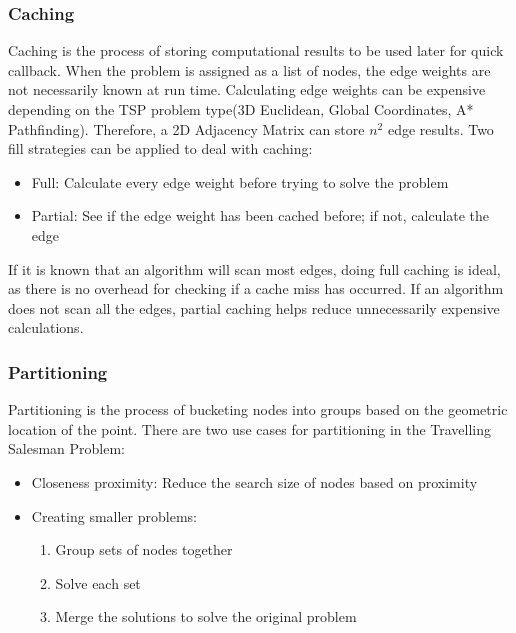 \subsubsection{Caching}
\label{lit:Caching}
Caching is the process of storing computational results to be used later for quick callback. When the problem is assigned as a list of nodes, the edge weights are not necessarily known at run time\cite{applegate2006traveling}. Calculating edge weights can be expensive depending on the TSP problem type(3D Euclidean, Global Coordinates, A* Pathfinding)\cite{Caching-performance}. Therefore, a 2D Adjacency Matrix can store $n^2$ edge results. Two fill strategies can be applied to deal with caching:

\begin{itemize}
    \item Full: Calculate every edge weight before trying to solve the problem
    \item Partial: See if the edge weight has been cached before; if not, calculate the edge
\end{itemize}

If it is known that an algorithm will scan most edges, doing full caching is ideal, as there is no overhead for checking if a cache miss has occurred. If an algorithm does not scan all the edges, partial caching helps reduce unnecessarily expensive calculations.

\subsubsection{Partitioning}
\label{partitioning}
Partitioning is the process of bucketing nodes into groups based on the geometric location of the point\cite{applegate2006traveling}. There are two use cases for partitioning in the Travelling Salesman Problem\cite{karp1977probabilistic}\cite{Clustering-Tsp}\cite{Partioning-tsp}\cite{lin2022grid}:

\begin{itemize}
    \item Closeness proximity: Reduce the search size of nodes based on proximity
    \item Creating smaller problems:
        \begin{enumerate}
            \item Group sets of nodes together
            \item Solve each set
            \item Merge the solutions to solve the original problem
        \end{enumerate}
\end{itemize}

